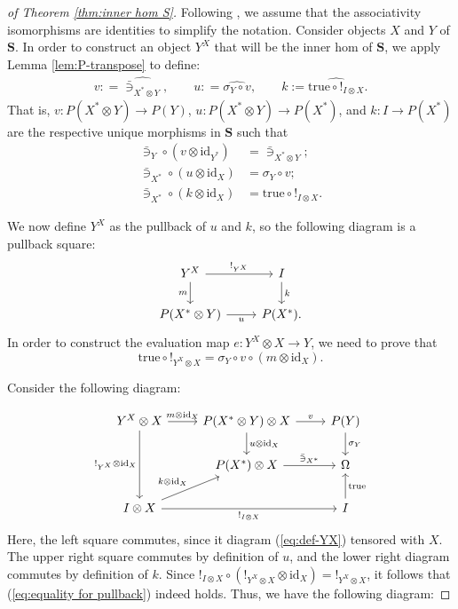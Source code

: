 \documentclass[12pt]{tac}
\theoremstyle{definition}
\theoremstyle{remark}
\newcommand{\<}{\langle}
\renewcommand{\>}{\rangle}
\renewcommand{\:}{\colon}
\newcommand{\id}{\mathrm{id}}
\newcommand{\true}{\mathrm{true}}
\begin{document}
\begin{proof}[of Theorem \ref{thm:inner hom S}]
Following \cite{MacLane-Moerdijk}, we assume that the associativity isomorphisms are identities to simplify the notation.
Consider objects $X$ and $Y$ of $\mathbf S$. In order to construct an object $Y^X$ that will be the inner hom of $\mathbf S$, we apply Lemma \ref{lem:P-transpose} to define:
\begin{align*}
    v : = \widehat{\bar\ni_{X^*\otimes Y}},\qquad
    u : = \widehat{\sigma_Y\circ v},\qquad
    k  := \widehat{\mathrm{true}\circ !_{I\otimes X}}.
\end{align*}
That is, $v:P(X^*\otimes Y)\to P(Y)$, $u:P(X^*\otimes Y)\to P(X^*)$, and $k:I\to P(X^*)$ are the respective unique morphisms in $\mathbf S$ such that 
\begin{align*}
   \bar\ni_Y\circ(v\otimes\id_{Y^*} )& = \bar\ni_{X^*\otimes Y};\\
   \bar\ni_{X^*}\circ(u\otimes \id_{X}) & = \sigma_Y\circ v;
\\
\bar\ni_{X^*}\circ (k\otimes \id_{X}) & = \true\circ !_{I\otimes X}.
\end{align*}

We now define $Y^X$ as the pullback of $u$ and $k$, so the following diagram is a pullback square:
 \begin{equation}\label{eq:def-YX}\begin{tikzcd}
Y^X\ar{r}{!_{Y^X}}\ar{d}[swap]{m} & I\ar{d}{k}\\
P(X^*\otimes Y)\ar{r}[swap]{u} & P(X^*).
\end{tikzcd}\end{equation}
In order to construct the evaluation map $e:Y^X\otimes X\to Y$, we need to prove that 
\begin{equation}\label{eq:equality for pullback}
\true\circ !_{Y^X\otimes X}=\sigma_Y\circ v\circ (m\otimes\id_X).    
\end{equation}

Consider the following diagram:


 \[\begin{tikzcd}
Y^X\otimes X\ar{r}{m\otimes\id_X}\ar{dd}[swap]{!_{Y^X}\otimes \id_X} & P(X^*\otimes Y)\otimes X\ar{r}{v}\ar{d}{u\otimes\id_X} & P(Y)\ar{d}{\sigma_Y} \\
& P(X^*)\otimes X\ar{r}{\bar\ni_{X^*}} & \Omega    \\
I\otimes X\ar{rr}[swap]{!_{I\otimes X}}\ar{ru}{k\otimes\id_X} && I\ar{u}[swap]{\true}
\end{tikzcd}\]
Here, the left square commutes, since it diagram (\ref{eq:def-YX}) tensored with $X$. The upper right square commutes by definition of $u$, and the lower right diagram commutes by definition of $k$. Since $!_{I\otimes X}\circ (!_{Y^ X\otimes X}\otimes\id_X)=!_{Y^ X\otimes X}$, it follows that (\ref{eq:equality for pullback}) indeed holds. Thus, we have the following diagram:


\end{proof}
\end{document}
